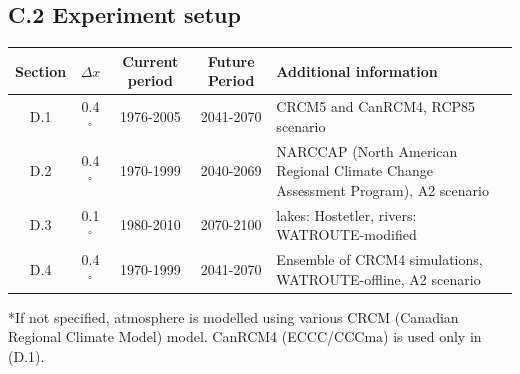 \documentclass[a0,landscape]{a0poster}
\begin{document}
\begin{multicols*}{4}
\subsection*{C.2 Experiment setup}
\begin{center}
  \small
  \begin{supertabular}{ccccl} \toprule
      Section & $\Delta x$ & Current period & Future Period & Additional information \\ \toprule
      D.1    & 0.4$^\circ$ & 1976-2005      & 2041-2070     & \begin{minipage}[t]{8cm}\flushleft CRCM5 and CanRCM4, RCP85 scenario\vspace{0.8cm} \end{minipage}\\
      D.2    & 0.4$^\circ$ & 1970-1999      & 2040-2069     & \begin{minipage}[t]{8cm}\flushleft NARCCAP (North American Regional Climate Change Assessment Program), A2 scenario\vspace{0.8cm} \end{minipage}\\
      D.3    & 0.1$^\circ$ & 1980-2010      & 2070-2100     & \begin{minipage}[t]{8cm}\flushleft lakes: Hostetler, rivers: WATROUTE-modified\vspace{0.8cm} \end{minipage}\\
      D.4    & 0.4$^\circ$ & 1970-1999      & 2041-2070     & \begin{minipage}[t]{8cm}\flushleft Ensemble of CRCM4 simulations, WATROUTE-offline, A2 scenario\vspace{0.8cm} \end{minipage}\\
      \bottomrule
  \end{supertabular}

  \vspace{1cm}
  \begin{minipage}{\linewidth}
   *If not specified, atmosphere is modelled using various CRCM (Canadian Regional Climate Model) model. CanRCM4 (ECCC/CCCma) is used only in (D.1).
  \end{minipage}
\end{center}




\end{multicols*}
\end{document}
